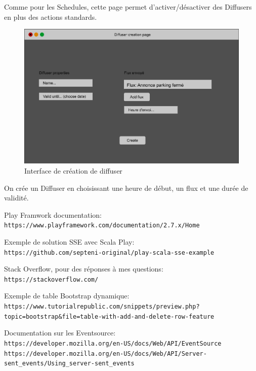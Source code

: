 \documentclass[french]{article}
\begin{document}
\begin{appendices}
	Comme pour les Schedules, cette page permet d'activer/désactiver des Diffusers en plus des actions standards.
	
	\begin{figure}[h!]
		\centering
		\includegraphics[scale=0.3]{mockup/m_diffuser_creation}
		\caption{Interface de création de diffuser}
		\label{fig:diffuserCreation}
	\end{figure}
	
	On crée un Diffuser en choisissant une heure de début, un flux et une durée de validité.
 
\end{appendices}

\newpage
\begin{thebibliography}{9}
Play Framwork documentation:
\\\texttt{https://www.playframework.com/documentation/2.7.x/Home}
 
Exemple de solution SSE avec Scala Play:
\\\texttt{https://github.com/septeni-original/play-scala-sse-example}

Stack Overflow, pour des réponses à mes questions:
\\\texttt{https://stackoverflow.com/}

Exemple de table Bootstrap dynamique:
\\\texttt{https://www.tutorialrepublic.com/snippets/preview.php?topic=bootstrap\&file=table-with-add-and-delete-row-feature}

Documentation sur les Eventsource:
\\\texttt{https://developer.mozilla.org/en-US/docs/Web/API/EventSource}
\\\texttt{https://developer.mozilla.org/en-US/docs/Web/API/Server-sent\_events/Using\_server-sent\_events}

\end{thebibliography}
\end{document}
